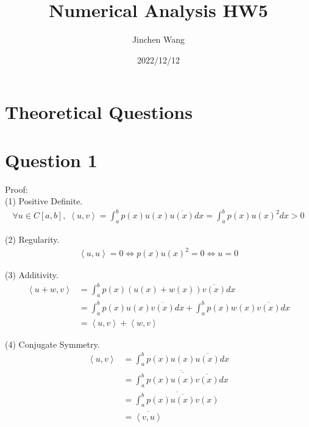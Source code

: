 \documentclass[11pt,a4paper]{article}
\title{Numerical Analysis HW5
}
\author{Jinchen Wang}
\date{2022/12/12}
\theoremstyle{plain}
\begin{document}
\maketitle

\section*{Theoretical Questions}
\section*{Question 1}
\noindent Proof:\\
(1) Positive Definite.
\begin{equation}
    \begin{aligned}
        \forall u \in C[a,b],\;	\left \langle {u,v}\right \rangle = \int_{a}^{b} p(x)u(x)\overline{u(x)} dx =  \int_{a}^{b} p(x)u(x)^2 dx > 0
    \end{aligned}
\end{equation}

\noindent(2) Regularity.
\begin{equation}
    \begin{aligned}
        \left \langle {u,u}\right \rangle = 0 \Leftrightarrow p(x)u(x)^2 = 0 \Leftrightarrow u = 0
    \end{aligned}
\end{equation}

\noindent(3) Additivity.
\begin{equation}
    \begin{aligned}
        \left \langle {u+w,v}\right \rangle &= \int_{a}^{b} p(x)(u(x)+w(x))\overline{v(x)} dx\\
        &= \int_{a}^{b} p(x)u(x)\overline{v(x)}dx+ \int_{a}^{b} p(x)w(x)\overline{v(x)}dx\\
        &=  \left \langle {u,v}\right \rangle + \left \langle {w,v}\right \rangle
    \end{aligned}
\end{equation}

\noindent(4) Conjugate Symmetry.
\begin{equation}
    \begin{aligned}
        \left \langle {u,v} \right \rangle &= \int_{a}^{b} p(x)u(x)\overline{u(x)} dx\\
        &= \overline{\int_{a}^{b} \overline{p(x)u(x)\overline{v(x)}}dx}\\
        &= \overline{\int_{a}^{b} p(x)\overline{u(x)}v(x)}\\
        &= \overline{ \left \langle {v,u} \right \rangle}
    \end{aligned}
\end{equation}
\end{document}
